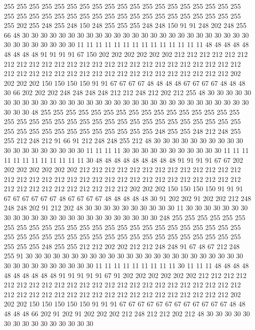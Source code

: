 255 255 255 255 255 255 255 255 255 255 255 255 255 255 255 255 255 255 255 255
255 255 255 255 255 255 255 255 255 255 255 255 255 255 255 255 255 255 255 202
255 248 255 248 150 248 255 255 255 248 248 150 91 91 248 202 248 255 66 48
30 30 30 30 30 30 30 30 30 30 30 30 30 30 30 30 30 30 30 30
30 30 30 30 30 30 30 30 30 30 30 30 30 11 11 11 11 11 11 11
11 11 11 11 11 11 11 48 48 48 48 48 48 48 48 48 91 91 91 91
67 150 202 202 202 202 202 202 212 212 212 212 212 212 212 212 212 212 212 212
212 212 212 212 212 212 212 212 212 212 212 212 212 212 212 212 212 212 212 212
212 212 212 212 212 212 212 212 212 212 212 202 202 202 202 150 150 150 150 91
91 67 67 67 67 48 48 48 48 67 67 67 67 48 48 48 30 66 202 202
202 248 248 248 248 212 212 248 212 202 212 255 48 30 30 30 30 30 30 30
30 30 30 30 30 30 30 30 30 30 30 30 30 30 30 30 30 30 30 30
30 30 30 30 30 30 30 30 48 255 255 255 255 255 255 255 255 255 255 255
255 255 255 255 255 255 255 255 255 255 255 255 255 255 255 255 255 255 255 255
255 255 255 255 255 255 255 255 255 255 255 255 255 255 255 255 248 255 255 248
212 248 255 255 212 248 212 91 66 91 212 248 248 255 212 48 30 30 30 30
30 30 30 30 30 30 30 30 30 30 30 30 30 30 30 11 11 11 11 30
30 30 30 30 30 30 30 30 30 30 11 11 11 11 11 11 11 11 11 11
11 11 30 48 48 48 48 48 48 48 48 48 91 91 91 91 67 67 202 202
202 202 202 202 202 212 212 212 212 212 212 212 212 212 212 212 212 212 212 212
212 212 212 212 212 212 212 212 212 212 212 212 212 212 212 212 212 212 212 212
212 212 212 212 212 212 212 202 202 202 150 150 150 150 91 91 91 67 67 67
67 67 67 48 67 67 67 67 48 48 48 48 48 30 91 202 202 91 202 202
212 248 248 248 202 91 212 202 48 30 30 30 30 30 30 30 30 30 30 11
30 30 30 30 30 30 30 30 30 30 30 30 30 30 30 30 30 30 30 30
30 30 30 30 248 255 255 255 255 255 255 255 255 255 255 255 255 255 255 255
255 255 255 255 255 255 255 255 255 255 255 255 255 255 255 255 255 255 255 255
255 255 255 255 255 255 255 255 255 255 255 255 248 255 255 212 212 202 202 212
212 248 248 91 67 48 67 212 248 255 91 30 30 30 30 30 30 30 30 30
30 30 30 30 30 30 30 30 30 30 30 30 30 30 30 30 30 30 30 30
30 30 30 30 30 11 11 11 11 11 11 11 11 11 30 11 11 11 48 48
48 48 48 48 48 48 48 48 91 91 91 91 91 67 91 202 202 202 202 202
202 212 212 212 212 212 212 212 212 212 212 212 212 212 212 212 212 212 212 212
212 212 212 212 212 212 212 212 212 212 212 212 212 212 212 212 212 212 212 212
212 212 202 202 202 150 150 150 150 150 91 91 91 67 67 67 67 67 67 67
67 67 67 67 67 48 48 48 48 48 66 202 91 202 91 202 202 202 212 248
212 212 202 212 48 30 30 30 30 30 30 30 30 30 30 30 30 30 30 30
